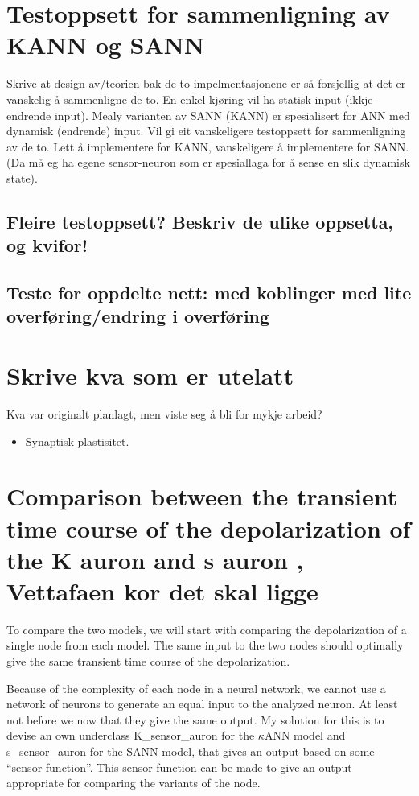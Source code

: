 \section{Testoppsett for sammenligning av KANN og SANN}
Skrive at design av/teorien bak  de to impelmentasjonene er så forsjellig at det er vanskelig å sammenligne de to. En enkel kjøring vil ha statisk input (ikkje-endrende input).
Mealy varianten av SANN (KANN) er spesialisert for ANN med dynamisk (endrende) input. Vil gi eit vanskeligere testoppsett for sammenligning av de to. Lett å implementere for KANN, vanskeligere å implementere for SANN.
(Da må eg ha egene sensor-neuron som er spesiallaga for å sense en slik dynamisk state).

	\subsection{Fleire testoppsett? Beskriv de ulike oppsetta, og kvifor!}
	\subsection{Teste for oppdelte nett: med koblinger med lite overføring/endring i overføring}

\section{Skrive kva som er utelatt} %
Kva var originalt planlagt, men viste seg å bli for mykje arbeid?

\begin{itemize}
 	\item Synaptisk plastisitet.
\end{itemize}




\section{Comparison between the transient time course of the depolarization of the K auron and s auron ,   Vettafaen kor det skal ligge}
To compare %
			the two models, we will start with comparing the depolarization of a single node from each model.
The same input to the two nodes should optimally give the same transient time course of the depolarization.

Because of the complexity of each node in a neural network, we cannot use a network of neurons to generate an equal input to the analyzed neuron. 
At least not before we now that they give the same output.
My solution for this is 
						to devise an own underclass K\_sensor\_auron for the $\kappa$ANN model and s\_sensor\_auron for the SANN model, that gives an output based on some ``sensor function''.
This sensor function can be made to give an output appropriate for comparing the variants of the node.

